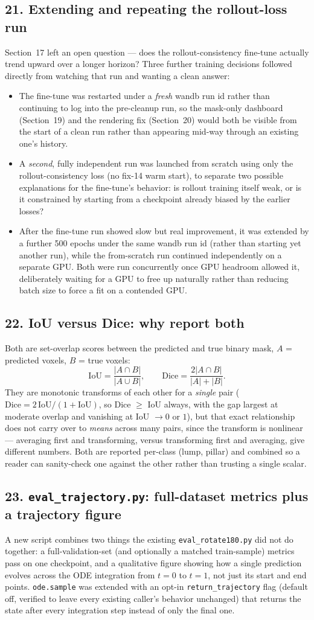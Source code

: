 \documentclass[11pt]{article}
\newcommand{\hsub}[1]{\subsection*{#1}}
\begin{document}
\hsub{21. Extending and repeating the rollout-loss run}
Section~17 left an open question --- does the rollout-consistency fine-tune actually trend
upward over a longer horizon? Three further training decisions followed directly from
watching that run and wanting a clean answer:
\begin{itemize}[nosep]
\item The fine-tune was restarted under a \emph{fresh} wandb run id rather than continuing to
  log into the pre-cleanup run, so the mask-only dashboard (Section~19) and the rendering fix
  (Section~20) would both be visible from the start of a clean run rather than appearing
  mid-way through an existing one's history.
\item A \emph{second}, fully independent run was launched from scratch using only the
  rollout-consistency loss (no fix-14 warm start), to separate two possible explanations for
  the fine-tune's behavior: is rollout training itself weak, or is it constrained by starting
  from a checkpoint already biased by the earlier losses?
\item After the fine-tune run showed slow but real improvement, it was extended by a further
  500 epochs under the same wandb run id (rather than starting yet another run), while the
  from-scratch run continued independently on a separate GPU. Both were run concurrently once
  GPU headroom allowed it, deliberately waiting for a GPU to free up naturally rather than
  reducing batch size to force a fit on a contended GPU.
\end{itemize}

\hsub{22. IoU versus Dice: why report both}
Both are set-overlap scores between the predicted and true binary mask, $A$ = predicted
voxels, $B$ = true voxels:
\[
\mathrm{IoU} = \frac{|A \cap B|}{|A \cup B|}, \qquad
\mathrm{Dice} = \frac{2|A \cap B|}{|A| + |B|}.
\]
They are monotonic transforms of each other for a \emph{single} pair
($\mathrm{Dice} = 2\,\mathrm{IoU}/(1+\mathrm{IoU})$, so Dice $\geq$ IoU always, with the gap
largest at moderate overlap and vanishing at IoU $\to 0$ or $1$), but that exact relationship
does not carry over to \emph{means} across many pairs, since the transform is nonlinear ---
averaging first and transforming, versus transforming first and averaging, give different
numbers. Both are reported per-class (lump, pillar) and combined so a reader can sanity-check
one against the other rather than trusting a single scalar.

\hsub{23. \texttt{eval\_trajectory.py}: full-dataset metrics plus a trajectory figure}
A new script combines two things the existing \texttt{eval\_rotate180.py} did not do together:
a full-validation-set (and optionally a matched train-sample) metrics pass on one checkpoint,
and a qualitative figure showing how a single prediction evolves across the ODE integration
from $t{=}0$ to $t{=}1$, not just its start and end points. \texttt{ode.sample} was extended
with an opt-in \texttt{return\_trajectory} flag (default off, verified to leave every existing
caller's behavior unchanged) that returns the state after every integration step instead of
only the final one.
\end{document}
